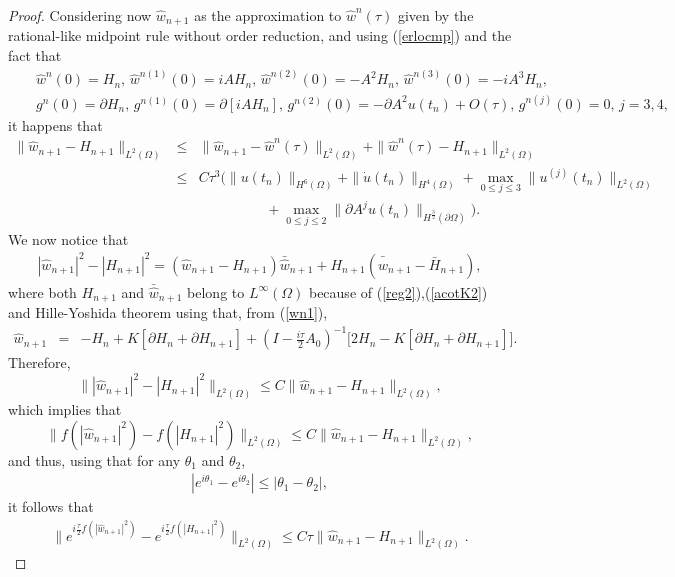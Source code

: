\documentclass[a4paper,12pt]{article}
\begin{document}
\begin{proof}
Considering now $\hat{w}_{n+1}$ as the approximation to $\hat{w}^n(\tau)$ given by the rational-like midpoint rule without order reduction, and using (\ref{erlocmp}) and the fact that
\begin{eqnarray}
&&\hat{w}^n(0)=H_n, \, \hat{w}^{n(1)}(0)=i A H_n, \, \hat{w}^{n(2)}(0)=-A^2 H_n, \, \hat{w}^{n(3)}(0)=-i A^3 H_n,\nonumber \\
&&g^n(0)=\partial H_n, \,  g^{n(1)}(0)=\partial [i A H_n],
\, g^{n(2)}(0)=-\partial A^2 u(t_n)+O(\tau), \, g^{n(j)}(0)=0, \, j=3,4, \nonumber
\end{eqnarray}
it happens that
\begin{eqnarray}
\|\hat{w}_{n+1}-H_{n+1}\|_{L^2(\Omega)}&\le& \|\hat{w}_{n+1}-\hat{w}^n(\tau)\|_{L^2(\Omega)}+\|\hat{w}^n(\tau)-H_{n+1}\|_{L^2(\Omega)}
\nonumber \\
&\le & C \tau^3 (\|u(t_n)\|_{H^6(\Omega)}+\|\dot{u}(t_n)\|_{H^4(\Omega)}+\max_{0\le j \le 3} \|u^{(j)}(t_n)\|_{L^2(\Omega)}
\nonumber \\
&& \hspace{2cm}+ \max_{0\le j \le 2}\| \partial A^j u(t_n)\|_{H^{\frac{3}{2}}(\partial \Omega)}).
\label{cot1}
\end{eqnarray}
We now notice that
\begin{eqnarray}
|\hat{w}_{n+1}|^2-|H_{n+1}|^2=(\hat{w}_{n+1}-H_{n+1}) \bar{\hat{w}}_{n+1}+H_{n+1}(\bar{\hat{w}}_{n+1}-\bar{H}_{n+1}),
\label{for1}
\end{eqnarray}
where both $H_{n+1}$ and $\bar{\hat{w}}_{n+1}$ belong to $L^\infty(\Omega)$ because of (\ref{reg2}),(\ref{acotK2}) and Hille-Yoshida theorem using that, from (\ref{wn1}),
\begin{eqnarray}
\hat{w}_{n+1}&=&-H_n+K [\partial H_n+\partial H_{n+1}]+(I-\frac{i \tau}{2} A_0)^{-1}\bigg[2 H_n- K[\partial H_n+\partial H_{n+1}]\bigg].
\nonumber
\end{eqnarray}
Therefore,
$$
\| |\hat{w}_{n+1}|^2-|H_{n+1}|^2\|_{L^2(\Omega)}\le C \|\hat{w}_{n+1}-H_{n+1}\|_{L^2(\Omega)},$$
which implies that
$$
\| f(|\hat{w}_{n+1}|^2)-f(|H_{n+1}|^2)\|_{L^2(\Omega)}\le C \|\hat{w}_{n+1}-H_{n+1}\|_{L^2(\Omega)},$$
and thus, using that for any $\theta_1$ and $\theta_2$,
\begin{eqnarray}
|e^{i \theta_1}-e^{i \theta_2}|\le |\theta_1-\theta_2|,
\label{theta12}
\end{eqnarray}
it follows that
\begin{eqnarray}
\| e^{i \frac{\tau}{2}f(|\hat{w}_{n+1}|^2)}-e^{i \frac{\tau}{2}f(|H_{n+1}|^2)}\|_{L^2(\Omega)}\le C \tau \|\hat{w}_{n+1}-H_{n+1}\|_{L^2(\Omega)}.

\end{eqnarray}
\end{proof}
\end{document}
